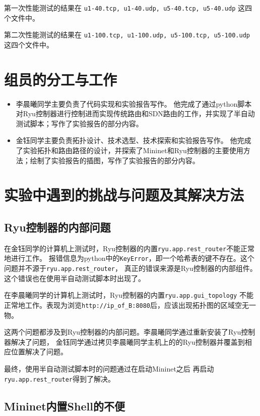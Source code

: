 第一次性能测试的结果在 \texttt{u1-40.tcp, u1-40.udp, u5-40.tcp, u5-40.udp} 这四个文件中。

第二次性能测试的结果在 \texttt{u1-100.tcp, u1-100.udp, u5-100.tcp, u5-100.udp} 这四个文件中。

\section{组员的分工与工作}

\begin{itemize}
	\item 李晨曦同学主要负责了代码实现和实验报告写作。
	他完成了通过python脚本对Ryu控制器进行控制进而实现传统路由和SDN路由的工作，并实现了半自动测试脚本；写作了实验报告的部分内容。
	\item 金钰同学主要负责拓扑设计、技术选型、技术探索和实验报告写作。
	他完成了实验拓扑和路由路径的设计，并探索了Mininet和Ryu控制器的主要使用方法；绘制了实验报告的插图，写作了实验报告的部分内容。
\end{itemize}

\section{实验中遇到的挑战与问题及其解决方法}

\subsection{Ryu控制器的内部问题}

在金钰同学的计算机上测试时，Ryu控制器的内置\texttt{ryu.app.rest\_router}不能正常地进行工作。
报错信息为python中的\texttt{KeyError}，即一个哈希表的键不存在。这个问题并不源于\texttt{ryu.app.rest\_router}，
真正的错误来源是Ryu控制器的内部组件。这个错误也在使用半自动测试脚本时出现了。

在李晨曦同学的计算机上测试时，Ryu控制器的内置\texttt{ryu.app.gui\_topology}
不能正常地工作。表现为浏览\texttt{http://ip\_of\_B:8080}后，应该出现拓扑图的区域空无一物。

这两个问题都涉及到Ryu控制器的内部问题。李晨曦同学通过重新安装了Ryu控制器解决了问题，
金钰同学通过拷贝李晨曦同学主机上的的Ryu控制器并覆盖到相应位置解决了问题。

最终，使用半自动测试脚本时的问题通过在启动Mininet之后
再启动\texttt{ryu.app.rest\_router}得到了解决。

\subsection{Mininet内置Shell的不便}

